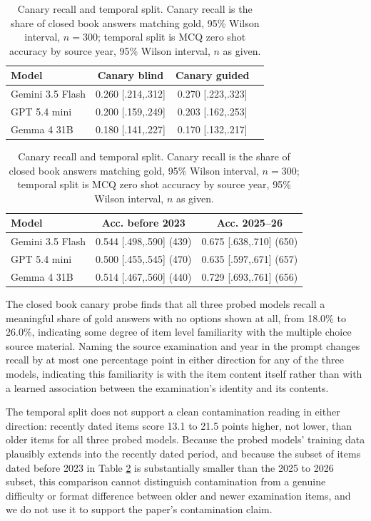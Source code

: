 \documentclass[11pt,a4paper]{article}
\begin{document}
\begin{table}[t]
\centering
\small
\begin{tabular}{lccc}
\toprule
\textbf{Model} & \textbf{Canary blind} & \textbf{Canary guided} \\
\midrule
Gemini 3.5 Flash & 0.260 [.214,.312] & 0.270 [.223,.323] \\
GPT 5.4 mini & 0.200 [.159,.249] & 0.203 [.162,.253] \\
Gemma 4 31B & 0.180 [.141,.227] & 0.170 [.132,.217] \\
\bottomrule
\end{tabular}
\vspace{0.3em}
\begin{tabular}{lcc}
\textbf{Model} & \textbf{Acc. before 2023} & \textbf{Acc. 2025--26} \\
\midrule
Gemini 3.5 Flash & 0.544 [.498,.590] (439) & 0.675 [.638,.710] (650) \\
GPT 5.4 mini & 0.500 [.455,.545] (470) & 0.635 [.597,.671] (657) \\
Gemma 4 31B & 0.514 [.467,.560] (440) & 0.729 [.693,.761] (656) \\
\bottomrule
\end{tabular}
\caption{Canary recall and temporal split. Canary recall is the share of closed book answers matching gold, 95\% Wilson interval, $n{=}300$; temporal split is MCQ zero shot accuracy by source year, 95\% Wilson interval, $n$ as given.}
\label{tab:canary-temporal}
\end{table}

The closed book canary probe finds that all three probed models recall a meaningful share of gold answers with no options shown at all, from 18.0\% to 26.0\%, indicating some degree of item level familiarity with the multiple choice source material. Naming the source examination and year in the prompt changes recall by at most one percentage point in either direction for any of the three models, indicating this familiarity is with the item content itself rather than with a learned association between the examination's identity and its contents.

The temporal split does not support a clean contamination reading in either direction: recently dated items score 13.1 to 21.5 points higher, not lower, than older items for all three probed models. Because the probed models' training data plausibly extends into the recently dated period, and because the subset of items dated before 2023 in Table \ref{tab:canary-temporal} is substantially smaller than the 2025 to 2026 subset, this comparison cannot distinguish contamination from a genuine difficulty or format difference between older and newer examination items, and we do not use it to support the paper's contamination claim.
\end{document}
